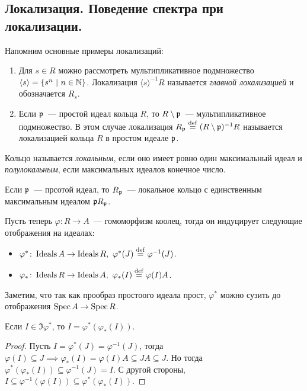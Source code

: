 	\subsection{Локализация. Поведение спектра при локализации.}

	Напомним основные примеры локализаций:

	\begin{enumerate}
		\item Для $s \in R$ можно рассмотреть мультипликативное подмножество $\langle s \rangle = \{ s^n \ \vert \ n \in \mathbb{N} \}$.  Локализация $\langle s \rangle^{-1}R$ называется \emph{главной локализацией} и обозначается $R_{s}$.

		\item Если $\mathfrak{p}$~--- простой идеал кольца $R$, то $R \setminus \mathfrak{p}$~--- мультипликативное подмножество. В этом случае локализация $R_{\mathfrak{p}} \stackrel{\mathrm{def}}{=} (R\setminus \mathfrak{p})^{-1}R$ называется локализацией кольца $R$ в простом идеале $\mathfrak{p}$.

	\end{enumerate}

	\begin{definition} 
		Кольцо называется \emph{локальным}, если оно имеет ровно один максимальный идеал и \emph{полулокальным}, если максимальных идеалов конечное число. 
	\end{definition}

	Если $\mathfrak{p}$~--- прсотой идеал, то $R_{\mathfrak{p}}$~--- локальное кольцо с единственным максимальным идеалом $\mathfrak{p} R_{\mathfrak{p}}$. 

	Пусть теперь $\varphi\colon R \to A$~--- гомоморфизм коолец, тогда он индуцирует следующие отображения на идеалах: 
	\begin{itemize}
		\item $\varphi^{*}\colon \operatorname{Ideals}{A} \to \operatorname{Ideals}{R}, \ \varphi^{*}(J) \stackrel{\mathrm{def}}{=} \varphi^{-1}(J)$.
		\item $\varphi_{*}\colon \operatorname{Ideals}{R} \to \operatorname{Ideals}{A}, \ \varphi_{*}(I) \stackrel{\mathrm{def}}{=}  \varphi(I)A$.
	\end{itemize}

	Заметим, что так как прообраз простоого идеала прост, $\varphi^{*}$ можно сузить до отображения $\operatorname{Spec}{A} \to \operatorname{Spec}{R}$.

	\begin{lemma} 
		Если $I \in \Im{\varphi^{*}}$, то $I = \varphi^{*}(\varphi_{*}(I))$.
	\end{lemma}
	\begin{proof}
		Пусть $I = \varphi^{*}(J) = \varphi^{-1}(J)$, тогда $\varphi(I) \subseteq J \implies  \varphi_{*}(I) = \varphi(I)A \subseteq JA \subseteq J$. Но тогда $\varphi^{*}(\varphi_{*}(I)) \subseteq \varphi^{-1}(J) = I$. С другой стороны, $I \subseteq \varphi^{-1}(\varphi(I)) \subseteq \varphi^{*}(\varphi_{*}(I))$.
	\end{proof}

